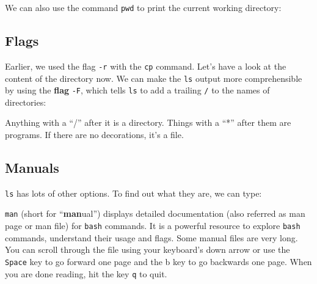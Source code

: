 \documentclass[
  letterpaper,
  DIV=11,
  numbers=noendperiod]{scrreprt}
\newenvironment{Shaded}{\begin{snugshade}}{\end{snugshade}}
\newcommand{\AttributeTok}[1]{\textcolor[rgb]{0.40,0.45,0.13}{#1}}
\newcommand{\ExtensionTok}[1]{\textcolor[rgb]{0.00,0.23,0.31}{#1}}
\newcommand{\NormalTok}[1]{\textcolor[rgb]{0.00,0.23,0.31}{#1}}
\begin{document}
We can also use the command \texttt{pwd} to print the current working
directory:

\begin{Shaded}
\end{Shaded}

\subsection{Flags}\label{flags}

Earlier, we used the flag \texttt{-r} with the \texttt{cp} command.
Let's have a look at the content of the directory now. We can make the
\texttt{ls} output more comprehensible by using the \textbf{flag}
\texttt{-F}, which tells \texttt{ls} to add a trailing \texttt{/} to the
names of directories:

\begin{Shaded}
\end{Shaded}

Anything with a ``/'' after it is a directory. Things with a ``*'' after
them are programs. If there are no decorations, it's a file.

\subsection{Manuals}\label{manuals}

\texttt{ls} has lots of other options. To find out what they are, we can
type:

\begin{Shaded}
\end{Shaded}

\texttt{man} (short for ``\textbf{man}ual'') displays detailed
documentation (also referred as man page or man file) for \texttt{bash}
commands. It is a powerful resource to explore \texttt{bash} commands,
understand their usage and flags. Some manual files are very long. You
can scroll through the file using your keyboard's down arrow or use the
\texttt{Space} key to go forward one page and the b key to go backwards
one page. When you are done reading, hit the key \texttt{q} to quit.
\end{document}
